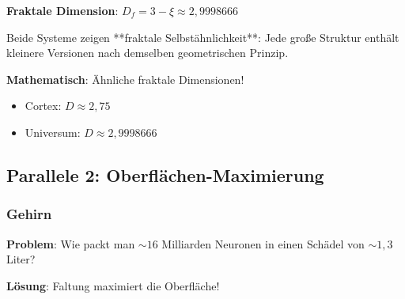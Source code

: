 	\begin{table}[h]
		\centering
		\small
		\caption{Selbstähnliche Torus-Strukturen über Skalen}
	\end{table}
	
	\textbf{Fraktale Dimension}: $D_f = 3 - \xi \approx 2,9998666$
	
	\begin{keyresult}
		Beide Systeme zeigen **fraktale Selbstähnlichkeit**: Jede große Struktur enthält kleinere Versionen nach demselben geometrischen Prinzip.
		
		\textbf{Mathematisch}: Ähnliche fraktale Dimensionen!
		\begin{itemize}
			\item Cortex: $D \approx 2,75$
			\item Universum: $D \approx 2,9998666$
		\end{itemize}
	\end{keyresult}
	
	\subsection{Parallele 2: Oberflächen-Maximierung}
	
	\subsubsection{Gehirn}
	
	\textbf{Problem}: Wie packt man $\sim 16$ Milliarden Neuronen in einen Schädel von $\sim 1,3$ Liter?
	
	\textbf{Lösung}: Faltung maximiert die Oberfläche!
	
